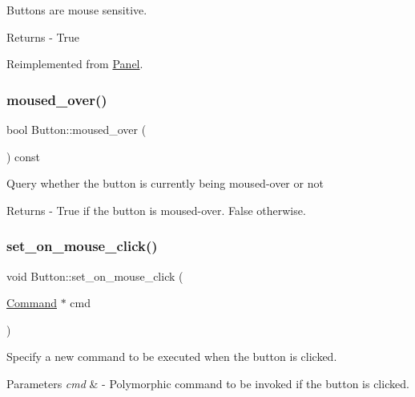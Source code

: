 Buttons are mouse sensitive. \begin{DoxyReturn}{Returns}
-\/ True 
\end{DoxyReturn}


Reimplemented from \mbox{\hyperlink{class_panel_a607fe6e1be6fd056f199fa817a4dedda}{Panel}}.

\mbox{\label{class_button_a683998d86b16a7bf4196f3f59b134f95}} 
\subsubsection{\texorpdfstring{moused\+\_\+over()}{moused\_over()}}
{\footnotesize\ttfamily bool Button\+::moused\+\_\+over (\begin{DoxyParamCaption}{ }\end{DoxyParamCaption}) const}

Query whether the button is currently being moused-\/over or not \begin{DoxyReturn}{Returns}
-\/ True if the button is moused-\/over. False otherwise. 
\end{DoxyReturn}
\mbox{\label{class_button_a7b60123b8609254c811e3c3cc9d50d07}} 
\subsubsection{\texorpdfstring{set\+\_\+on\+\_\+mouse\+\_\+click()}{set\_on\_mouse\_click()}}
{\footnotesize\ttfamily void Button\+::set\+\_\+on\+\_\+mouse\+\_\+click (\begin{DoxyParamCaption}\item[{\mbox{\hyperlink{class_command}{Command}} $\ast$}]{cmd }\end{DoxyParamCaption})}

Specify a new command to be executed when the button is clicked. 
\begin{DoxyParams}{Parameters}
{\em cmd} & -\/ Polymorphic command to be invoked if the button is clicked. \\
\hline
\end{DoxyParams}
\mbox{\label{class_button_a6133f9b42ae1192df54babd19dec9b80}} 
